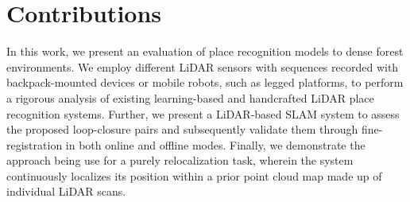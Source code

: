 

\section{Contributions}

In this work, we present an evaluation of place recognition models to dense forest environments. We employ different LiDAR sensors with sequences recorded with backpack-mounted devices or mobile robots, such as legged platforms, to perform a rigorous analysis of existing learning-based and handcrafted LiDAR place recognition systems. Further, we present a LiDAR-based SLAM system to assess the proposed loop-closure pairs and subsequently validate them through fine-registration in both online and offline modes. Finally, we demonstrate the approach being use for a purely relocalization task, wherein the system continuously localizes its position within a prior point cloud map made up of individual LiDAR scans.



